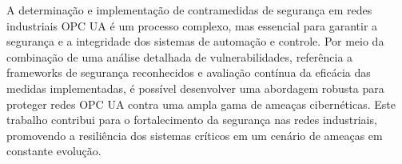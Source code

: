         A determinação e implementação de contramedidas de segurança em redes industriais OPC UA é um processo complexo, mas essencial para garantir a segurança e a integridade dos sistemas de automação e controle. Por meio da combinação de uma análise detalhada de vulnerabilidades, referência a frameworks de segurança reconhecidos e avaliação contínua da eficácia das medidas implementadas, é possível desenvolver uma abordagem robusta para proteger redes OPC UA contra uma ampla gama de ameaças cibernéticas. Este trabalho contribui para o fortalecimento da segurança nas redes industriais, promovendo a resiliência dos sistemas críticos em um cenário de ameaças em constante evolução.